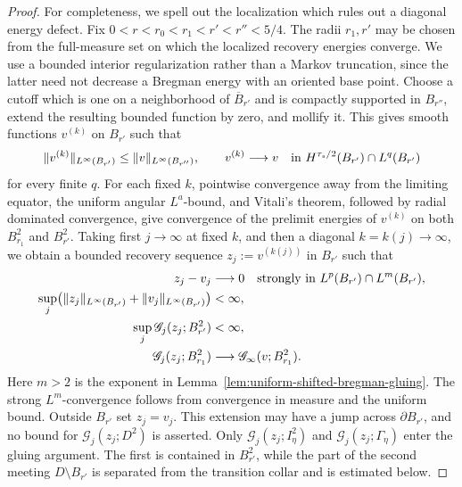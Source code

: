 \documentclass[11pt,reqno]{amsart}
\numberwithin{equation}{section}
\theoremstyle{remark}
\begin{document}
\begin{proof}
For completeness, we spell out the localization which rules out a
diagonal energy defect.  Fix
\(0<r<r_0<r_1<r'<r''<5/4\).  The radii \(r_1,r'\) may be chosen from
the full-measure set on which the localized recovery energies
converge.  We use a bounded interior regularization rather than a
Markov truncation, since the latter need not decrease a Bregman energy
with an oriented base point.  Choose a cutoff which is one on a
neighborhood of \(\overline B_{r'}\) and is compactly supported in
\(B_{r''}\), extend the resulting bounded function by zero, and
mollify it.  This gives smooth functions \(v^{(k)}\) on \(B_{r'}\)
such that
\[
 \|v^{(k)}\|_{L^\infty(B_{r'})}\le\|v\|_{L^\infty(B_{r''})},\qquad
 v^{(k)}\longrightarrow v
 \quad\hbox{in }H^{\tau_s/2}(B_{r'})
        \cap L^q(B_{r'})
\]
for every finite \(q\).  For each fixed \(k\), pointwise convergence
away from the limiting equator, the uniform angular \(L^a\)-bound, and
Vitali's theorem, followed by radial dominated convergence, give
convergence of the prelimit energies of \(v^{(k)}\) on both
\(B_{r_1}^2\) and \(B_{r'}^2\).  Taking first \(j\to\infty\) at fixed
\(k\), and then a diagonal \(k=k(j)\to\infty\), we obtain a bounded
recovery sequence \(z_j:=v^{(k(j))}\) in \(B_{r'}\) such that
\begin{align}
 z_j-v_j&\longrightarrow0
 \quad\hbox{strongly in }L^p(B_{r'})\cap L^m(B_{r'}),\notag\\
 \sup_j\bigl(\|z_j\|_{L^\infty(B_{r'})}
       +\|v_j\|_{L^\infty(B_{r'})}\bigr)&<\infty,
 \label{eq:bounded-recovery-strong-lp-lm}\\
 \sup_j\mathscr G_j(z_j;B_{r'}^2)&<\infty,\notag\\
 \mathscr G_j(z_j;B_{r_1}^2)
 &\longrightarrow\mathscr G_\infty(v;B_{r_1}^2).
 \label{eq:localized-recovery-energy}
\end{align}
Here \(m>2\) is the exponent in
Lemma~\ref{lem:uniform-shifted-bregman-gluing}.  The strong
\(L^m\)-convergence follows from convergence in measure and the uniform
bound.  Outside \(B_{r'}\) set \(z_j=v_j\).  This extension may have a
jump across \(\partial B_{r'}\), and no bound for
\(\mathscr G_j(z_j;D^2)\) is asserted.  Only
\(\mathscr G_j(z_j;I_\eta^2)\) and
\(\mathscr G_j(z_j;\Gamma_\eta)\) enter the gluing argument.  The first
is contained in \(B_{r'}^2\), while the part of the second meeting
\(D\setminus B_{r'}\) is separated from the transition collar and is
estimated below.


\end{proof}
\end{document}
